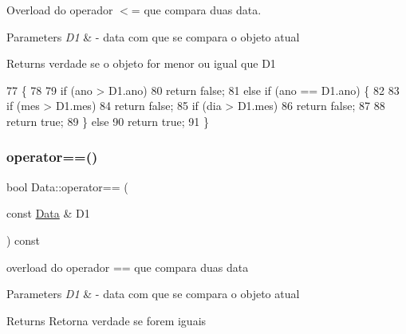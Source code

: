 Overload do operador $<$= que compara duas data. 


\begin{DoxyParams}{Parameters}
{\em D1} & -\/ data com que se compara o objeto atual \\
\hline
\end{DoxyParams}
\begin{DoxyReturn}{Returns}
verdade se o objeto for menor ou igual que D1 
\end{DoxyReturn}

\begin{DoxyCode}
77                                           \{
78 
79     \textcolor{keywordflow}{if} (ano > D1.ano)
80         \textcolor{keywordflow}{return} \textcolor{keyword}{false};
81     \textcolor{keywordflow}{else} \textcolor{keywordflow}{if} (ano == D1.ano) \{
82 
83         \textcolor{keywordflow}{if} (mes > D1.mes)
84             \textcolor{keywordflow}{return} \textcolor{keyword}{false};
85         \textcolor{keywordflow}{if} (dia > D1.mes)
86             \textcolor{keywordflow}{return} \textcolor{keyword}{false};
87 
88         \textcolor{keywordflow}{return} \textcolor{keyword}{true};
89     \} \textcolor{keywordflow}{else}
90         \textcolor{keywordflow}{return} \textcolor{keyword}{true};
91 \}
\end{DoxyCode}
\mbox{\label{classData_af00bf4efbd3504689f6bc7283378ba5f}} 
\subsubsection{\texorpdfstring{operator==()}{operator==()}}
{\footnotesize\ttfamily bool Data\+::operator== (\begin{DoxyParamCaption}\item[{const \hyperlink{classData}{Data} \&}]{D1 }\end{DoxyParamCaption}) const}



overload do operador == que compara duas data 


\begin{DoxyParams}{Parameters}
{\em D1} & -\/ data com que se compara o objeto atual \\
\hline
\end{DoxyParams}
\begin{DoxyReturn}{Returns}
Retorna verdade se forem iguais 
\end{DoxyReturn}

